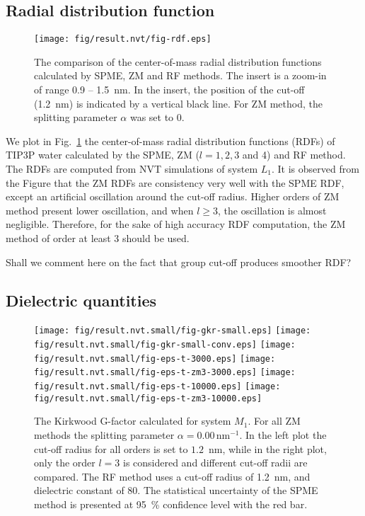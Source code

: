 \documentclass[aip,jcp,a4paper,preprint,unsortedaddress,onecolumn,fleqn]{revtex4-1}
\newcommand{\recheck}[1]{{\color{red} #1}}
\newcommand{\systemmb}{M_1}
\newcommand{\systemlb}{L_1}
\begin{document}
\subsection{Radial distribution function}

\begin{figure}
  \centering
  \texttt{[image: fig/result.nvt/fig-rdf.eps]}  
  \caption{The comparison of the center-of-mass radial distribution functions
    calculated by SPME, ZM and RF methods. The insert is a zoom-in of
    range 0.9 -- 1.5~nm. In the insert, the position of the cut-off
    (1.2~nm) is indicated by a vertical black line.
    For ZM method, the splitting parameter $\alpha$ was set to 0.
  }
  \label{fig:rdf}
\end{figure}

We plot in Fig.~\ref{fig:rdf} the center-of-mass radial distribution functions (RDFs) of TIP3P water
calculated by the SPME, ZM ($l=1,2,3$ and 4) and RF method.  The RDFs
are computed from NVT simulations of system $\systemlb$. It is
observed from the Figure that the ZM RDFs are consistency very well
with the SPME RDF, except an artificial oscillation around the
cut-off radius. Higher orders of ZM method present lower oscillation, and when
$l\geq 3$, the oscillation is almost negligible. Therefore, for the sake
of high accuracy RDF computation, the ZM method of order at least 3 should be used.

\recheck{Shall we comment here on the fact that group cut-off produces smoother RDF?}



\subsection{Dielectric quantities}


\begin{figure}
  \centering
  \texttt{[image: fig/result.nvt.small/fig-gkr-small.eps]}
  \texttt{[image: fig/result.nvt.small/fig-gkr-small-conv.eps]}
  \texttt{[image: fig/result.nvt.small/fig-eps-t-3000.eps]}
  \texttt{[image: fig/result.nvt.small/fig-eps-t-zm3-3000.eps]}
  \texttt{[image: fig/result.nvt.small/fig-eps-t-10000.eps]}
  \texttt{[image: fig/result.nvt.small/fig-eps-t-zm3-10000.eps]}
  \caption{The Kirkwood G-factor calculated for system $\systemmb$.
    For all ZM methods the splitting parameter $\alpha = 0.00\,\textrm{nm}^{-1}$.
    In the left plot the cut-off radius for all orders is set to $1.2$~nm, while
    in the right plot, only the order $l=3$ is considered and different cut-off radii are compared.
    The RF method uses a cut-off radius of 1.2~nm, and dielectric constant of 80.
    The statistical uncertainty of the SPME method is presented at 95~\% confidence level with the red bar.
  }
  \label{fig:tmp1}
\end{figure}
\end{document}
